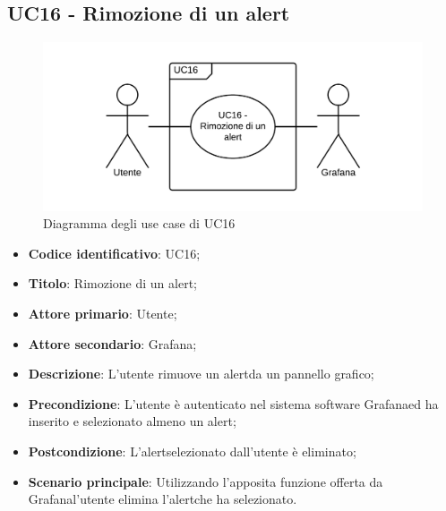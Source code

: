\subsection{UC16 - Rimozione di un alert}
\begin{figure}[H]
\includegraphics{img/UC16_-_Rimozione_di_un_alert.png}
\caption{Diagramma degli use case di UC16}
\end{figure}
\begin{itemize}
	\item \textbf{Codice identificativo}: UC16;
	\item \textbf{Titolo}: Rimozione di un alert\glo;
	\item \textbf{Attore primario}: Utente;
	\item \textbf{Attore secondario}: Grafana\glo;
	\item \textbf{Descrizione}: L'utente rimuove un alert\glosp da un pannello grafico;
	\item \textbf{Precondizione}: L'utente è autenticato nel sistema software Grafana\glosp ed ha inserito e selezionato almeno un alert\glo;
	\item \textbf{Postcondizione}: L'alert\glosp selezionato dall'utente è eliminato;
	\item \textbf{Scenario principale}: Utilizzando l'apposita funzione offerta da Grafana\glosp l'utente elimina l'alert\glosp che ha selezionato.
\end{itemize} 
